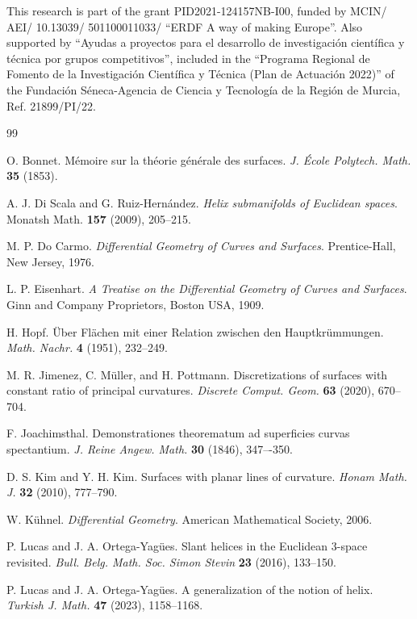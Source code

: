 \documentclass[11pt,a4paper]{article}
\begin{document}
This research is part of the grant PID2021-124157NB-I00, funded by MCIN/ AEI/ 10.13039/ 501100011033/ ``ERDF A way of making Europe''. Also supported by ``Ayudas a proyectos para el desarrollo de investigación científica y técnica por grupos competitivos'', included in the ``Programa Regional de Fomento de la Investigación Científica y Técnica (Plan de Actuación 2022)'' of the Fundación Séneca-Agencia de Ciencia y Tecnología de la Región de Murcia, Ref. 21899/PI/22.

\begin{thebibliography}{99}
\small
\parskip0pt

O. Bonnet.
Mémoire sur la théorie générale des surfaces.
\emph{J. École Polytech. Math.} \textbf{35} (1853).

A. J. Di Scala and G. Ruiz-Hern\'andez.
\emph{Helix submanifolds of Euclidean spaces}.
Monatsh Math. \textbf{157} (2009), 205--215.

M. P. Do Carmo.
\emph{Differential Geometry of Curves and Surfaces}.
Prentice-Hall, New Jersey, 1976.

L. P. Eisenhart.
\emph{A Treatise on the Differential Geometry of Curves and Surfaces}.
Ginn and Company Proprietors, Boston USA, 1909.

H. Hopf.
Über Flächen mit einer Relation zwischen den Hauptkrümmungen.
\emph{Math. Nachr.} \textbf{4} (1951), 232--249.

M. R. Jimenez, C. Müller, and H. Pottmann.
Discretizations of surfaces with constant ratio of principal curvatures.
\emph{Discrete Comput. Geom.} \textbf{63} (2020), 670--704.

F. Joachimsthal.
Demonstrationes theorematum ad superficies curvas spectantium.
\emph{J. Reine Angew. Math.} \textbf{30} (1846), 347–-350.

D. S. Kim and Y. H. Kim.
Surfaces with planar lines of curvature.
\emph{Honam Math. J.} \textbf{32} (2010), 777--790.

W. Kühnel.
\emph{Differential Geometry}.
American Mathematical Society, 2006.

P. Lucas and J. A. Ortega-Yagües.
Slant helices in the Euclidean 3-space revisited.
\emph{Bull. Belg. Math. Soc. Simon Stevin} \textbf{23} (2016), 133--150.

P. Lucas and J. A. Ortega-Yagües.
A generalization of the notion of helix.
\emph{Turkish J. Math.} \textbf{47} (2023), 1158--1168.


\end{thebibliography}
\end{document}
